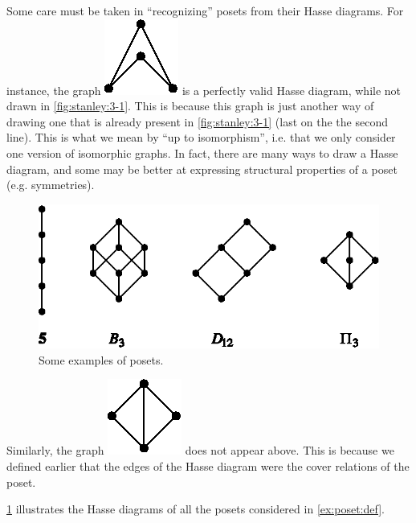Some care must be taken in ``recognizing'' posets from their Hasse diagrams.
For instance, the graph \includegraphics{fig/stanley/3-1:a} is a perfectly
valid Hasse diagram, while not drawn in \ref{fig:stanley:3-1}. This is because
this graph is just another way of drawing one that is already present in
\ref{fig:stanley:3-1} (last on the the second line).
This is what we mean by ``up to isomorphism'', i.e. that we only consider one
version of isomorphic graphs. In fact, there are many ways to draw a Hasse
diagram, and some may be better at expressing structural properties of a poset
(e.g. symmetries).


\begin{figure}
	\centering
	\includegraphics[height=0.2\textheight]{fig/stanley/3-2}
	\caption{\label{fig:stanley:3-2} Some examples of posets.
\cite{Stanley:2011:ECV:2124415}}
\end{figure}


Similarly, the graph \includegraphics{fig/stanley/3-1:b} does not appear above.
This is because we defined earlier that the edges of the Hasse diagram were the
cover relations of the poset.


\ref{fig:stanley:3-2} illustrates the Hasse diagrams of all the posets
considered in \ref{ex:poset:def}.


